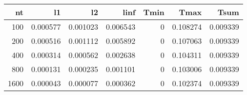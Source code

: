 \begin{tabular}{rrrrrrr}
\toprule
   nt &        l1 &        l2 &      linf &  Tmin &      Tmax &      Tsum \\
\midrule
  100 &  0.000577 &  0.001023 &  0.006543 &     0 &  0.108274 &  0.009339 \\
  200 &  0.000516 &  0.001112 &  0.005892 &     0 &  0.107063 &  0.009339 \\
  400 &  0.000314 &  0.000562 &  0.002638 &     0 &  0.104311 &  0.009339 \\
  800 &  0.000131 &  0.000235 &  0.001101 &     0 &  0.103006 &  0.009339 \\
 1600 &  0.000043 &  0.000077 &  0.000362 &     0 &  0.102374 &  0.009339 \\
\bottomrule
\end{tabular}
